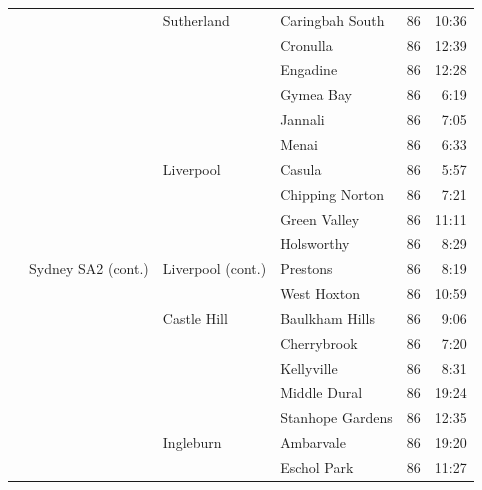 \documentclass{grattan}
\begin{document}
\begin{longtable}{Nlllrr}
 &                                & Sutherland            & Caringbah South      & 86  & 10:36 \\
 &                                &                       & Cronulla             & 86  & 12:39 \\
 &                                &                       & Engadine             & 86  & 12:28 \\
 &                                &                       & Gymea Bay            & 86  & 6:19 \\
 &                                &                       & Jannali              & 86  & 7:05 \\
 &                                &                       & Menai                & 86  & 6:33 \\
 &                                & Liverpool             & Casula               & 86  & 5:57 \\
 &                                &                       & Chipping Norton      & 86  & 7:21 \\
 &                                &                       & Green Valley         & 86  & 11:11 \\
 &                                &                       & Holsworthy           & 86  & 8:29 \\
 & Sydney SA2 (cont.)             & Liverpool (cont.)     & Prestons             & 86  & 8:19 \\
 &                                &                       & West Hoxton          & 86  & 10:59 \\
 &                                & Castle Hill           & Baulkham Hills       & 86  & 9:06 \\
 &                                &                       & Cherrybrook          & 86  & 7:20 \\
 &                                &                       & Kellyville           & 86  & 8:31 \\
 &                                &                       & Middle Dural         & 86  & 19:24 \\
 &                                &                       & Stanhope Gardens     & 86  & 12:35 \\
 &                                & Ingleburn             & Ambarvale            & 86  & 19:20 \\
 &                                &                       & Eschol Park          & 86  & 11:27 \\

\end{longtable}
\end{document}
